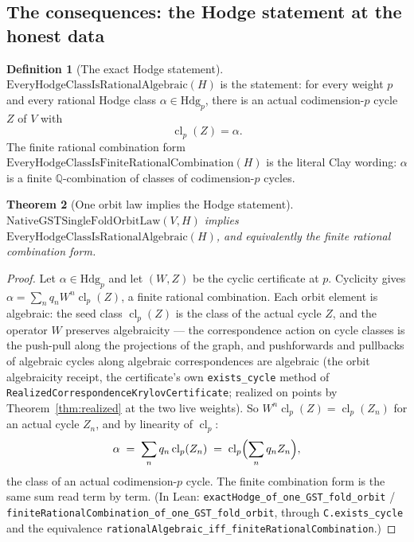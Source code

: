 \documentclass[11pt,a4paper]{article}
\theoremstyle{plain}
\newtheorem{theorem}{Theorem}[section]
\theoremstyle{definition}
\newtheorem{definition}[theorem]{Definition}
\newcommand{\Q}{\mathbb{Q}}
\newcommand{\cl}{\operatorname{cl}}
\begin{document}
\subsection{The consequences: the Hodge statement at the honest data}

\begin{definition}[The exact Hodge statement]
\label{def:exact-hodge}
$\mathrm{EveryHodgeClassIsRationalAlgebraic}(H)$ is the statement:
for every weight $p$ and every rational Hodge class $\alpha \in
\mathrm{Hdg}_p$, there is an actual codimension-$p$ cycle $Z$ of $V$
with
\[
\cl_p(Z) = \alpha .
\]
The finite rational combination form
$\mathrm{EveryHodgeClassIsFiniteRationalCombination}(H)$ is the
literal Clay wording: $\alpha$ is a finite $\Q$-combination of
classes of codimension-$p$ cycles.
\end{definition}

\begin{theorem}[One orbit law implies the Hodge statement]
\label{thm:consequence}
$\mathrm{NativeGSTSingleFoldOrbitLaw}(V,H)$ implies
$\mathrm{EveryHodgeClassIsRationalAlgebraic}(H)$, and equivalently
the finite rational combination form.
\end{theorem}

\begin{proof}
Let $\alpha \in \mathrm{Hdg}_p$ and let $(W,Z)$ be the cyclic
certificate at $p$.  Cyclicity gives $\alpha = \sum_{n} q_n W^n
\cl_p(Z)$, a finite rational combination.  Each orbit element is
algebraic: the seed class $\cl_p(Z)$ is the class of the actual cycle
$Z$, and the operator $W$ preserves algebraicity --- the
correspondence action on cycle classes is the push-pull along the
projections of the graph, and pushforwards and pullbacks of algebraic
cycles along algebraic correspondences are algebraic (the orbit
algebraicity receipt, the certificate's own \texttt{exists\_cycle}
method of \texttt{RealizedCorrespondenceKrylovCertificate}; realized on
points by Theorem~\ref{thm:realized} at the two live weights).  So
$W^n\cl_p(Z) = \cl_p(Z_n)$ for an actual cycle $Z_n$, and by
linearity of $\cl_p$:
\[
\alpha \;=\; \sum_n q_n \cl_p(Z_n) \;=\;
\cl_p\Bigl( \sum_n q_n Z_n \Bigr),
\]
the class of an actual codimension-$p$ cycle.  The finite combination
form is the same sum read term by term.  (In Lean:
\texttt{exactHodge\_of\_one\_GST\_fold\_orbit} /
\texttt{finiteRationalCombination\_of\_one\_GST\_fold\_orbit},
through \texttt{C.exists\_cycle} and the equivalence
\texttt{rationalAlgebraic\_iff\_finiteRationalCombination}.)
\end{proof}
\end{document}
